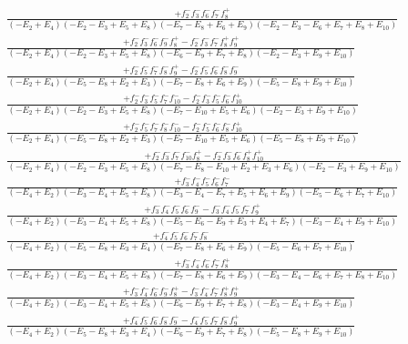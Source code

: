 \documentclass{article}
\begin{document}
\[\begin{array}{rcl}
\frac{+f_{2}^{-}f_{3}^{-}f_{6}^{-}f_{7}^{-}f_{8}^{+}}{(-E_{2}+E_{4})(-E_{2}-E_{3}+E_{5}+E_{8})(-E_{7}-E_{8}+E_{6}+E_{9})(-E_{2}-E_{3}-E_{6}+E_{7}+E_{8}+E_{10})}\\
\frac{+f_{2}^{-}f_{3}^{-}f_{6}^{-}f_{9}^{-}f_{8}^{+}-f_{2}^{-}f_{3}^{-}f_{7}^{-}f_{8}^{+}f_{9}^{+}}{(-E_{2}+E_{4})(-E_{2}-E_{3}+E_{5}+E_{8})(-E_{6}-E_{9}+E_{7}+E_{8})(-E_{2}-E_{3}+E_{9}+E_{10})}\\
\frac{+f_{2}^{-}f_{5}^{-}f_{7}^{-}f_{8}^{-}f_{9}^{+}-f_{2}^{-}f_{5}^{-}f_{6}^{-}f_{8}^{-}f_{9}^{-}}{(-E_{2}+E_{4})(-E_{5}-E_{8}+E_{2}+E_{3})(-E_{7}-E_{8}+E_{6}+E_{9})(-E_{5}-E_{8}+E_{9}+E_{10})}\\
\frac{+f_{2}^{-}f_{3}^{-}f_{5}^{-}f_{7}^{-}f_{10}^{-}-f_{2}^{-}f_{3}^{-}f_{5}^{-}f_{6}^{-}f_{10}^{+}}{(-E_{2}+E_{4})(-E_{2}-E_{3}+E_{5}+E_{8})(-E_{7}-E_{10}+E_{5}+E_{6})(-E_{2}-E_{3}+E_{9}+E_{10})}\\
\frac{+f_{2}^{-}f_{5}^{-}f_{7}^{-}f_{8}^{-}f_{10}^{-}-f_{2}^{-}f_{5}^{-}f_{6}^{-}f_{8}^{-}f_{10}^{+}}{(-E_{2}+E_{4})(-E_{5}-E_{8}+E_{2}+E_{3})(-E_{7}-E_{10}+E_{5}+E_{6})(-E_{5}-E_{8}+E_{9}+E_{10})}\\
\frac{+f_{2}^{-}f_{3}^{-}f_{7}^{-}f_{10}^{-}f_{8}^{+}-f_{2}^{-}f_{3}^{-}f_{6}^{-}f_{8}^{+}f_{10}^{+}}{(-E_{2}+E_{4})(-E_{2}-E_{3}+E_{5}+E_{8})(-E_{7}-E_{8}-E_{10}+E_{2}+E_{3}+E_{6})(-E_{2}-E_{3}+E_{9}+E_{10})}\\
\frac{+f_{3}^{-}f_{4}^{-}f_{5}^{-}f_{6}^{-}f_{7}^{-}}{(-E_{4}+E_{2})(-E_{3}-E_{4}+E_{5}+E_{8})(-E_{3}-E_{4}-E_{7}+E_{5}+E_{6}+E_{9})(-E_{5}-E_{6}+E_{7}+E_{10})}\\
\frac{+f_{3}^{-}f_{4}^{-}f_{5}^{-}f_{6}^{-}f_{9}^{-}-f_{3}^{-}f_{4}^{-}f_{5}^{-}f_{7}^{-}f_{9}^{+}}{(-E_{4}+E_{2})(-E_{3}-E_{4}+E_{5}+E_{8})(-E_{5}-E_{6}-E_{9}+E_{3}+E_{4}+E_{7})(-E_{3}-E_{4}+E_{9}+E_{10})}\\
\frac{+f_{4}^{-}f_{5}^{-}f_{6}^{-}f_{7}^{-}f_{8}^{-}}{(-E_{4}+E_{2})(-E_{5}-E_{8}+E_{3}+E_{4})(-E_{7}-E_{8}+E_{6}+E_{9})(-E_{5}-E_{6}+E_{7}+E_{10})}\\
\frac{+f_{3}^{-}f_{4}^{-}f_{6}^{-}f_{7}^{-}f_{8}^{+}}{(-E_{4}+E_{2})(-E_{3}-E_{4}+E_{5}+E_{8})(-E_{7}-E_{8}+E_{6}+E_{9})(-E_{3}-E_{4}-E_{6}+E_{7}+E_{8}+E_{10})}\\
\frac{+f_{3}^{-}f_{4}^{-}f_{6}^{-}f_{9}^{-}f_{8}^{+}-f_{3}^{-}f_{4}^{-}f_{7}^{-}f_{8}^{+}f_{9}^{+}}{(-E_{4}+E_{2})(-E_{3}-E_{4}+E_{5}+E_{8})(-E_{6}-E_{9}+E_{7}+E_{8})(-E_{3}-E_{4}+E_{9}+E_{10})}\\
\frac{+f_{4}^{-}f_{5}^{-}f_{6}^{-}f_{8}^{-}f_{9}^{-}-f_{4}^{-}f_{5}^{-}f_{7}^{-}f_{8}^{-}f_{9}^{+}}{(-E_{4}+E_{2})(-E_{5}-E_{8}+E_{3}+E_{4})(-E_{6}-E_{9}+E_{7}+E_{8})(-E_{5}-E_{8}+E_{9}+E_{10})}\\

\end{array}\]
\end{document}
